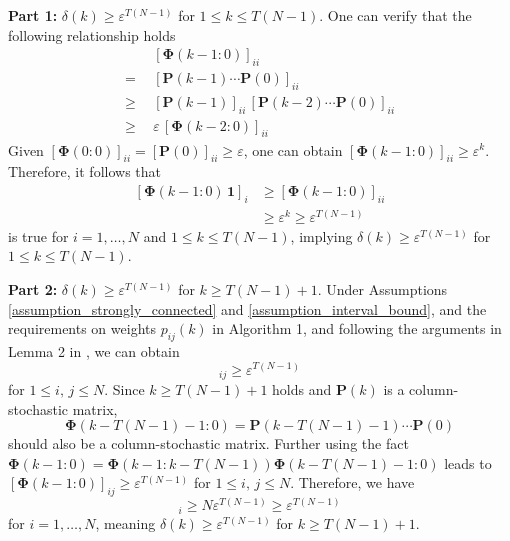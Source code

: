 \documentclass{IEEEtran}
\begin{document}
\textbf{Part 1:} $\delta(k) \geq \varepsilon^{T(N-1)}$ for $1 \leq k \leq T(N-1)$. One can verify that the following relationship holds
\begin{equation} 
\begin{aligned}
& [\mathbf{\Phi}(k-1:0)]_{ii} \\
= \ \ & [\mathbf{P}(k-1) \cdots \mathbf{P}(0)]_{ii} \\
\geq \ \ & [\mathbf{P}(k-1)]_{ii} \, [\mathbf{P}(k-2) \cdots \mathbf{P}(0)]_{ii}\\
\geq \ \ & \varepsilon \, [\mathbf{\Phi}(k-2:0)]_{ii}
\end{aligned} 
\end{equation}
Given $[\mathbf{\Phi}(0:0)]_{ii}=[\mathbf{P}(0)]_{ii} \geq \varepsilon$, one can obtain $[\mathbf{\Phi}(k-1:0)]_{ii} \geq \varepsilon^k$. Therefore, it follows that
\begin{equation} 
\begin{aligned}
\left[\mathbf{\Phi}(k-1:0) \, \mathbf{1}\right]_i & \geq [\mathbf{\Phi}(k-1:0)]_{ii} \\
& \geq \varepsilon^k \geq \varepsilon^{T(N-1)}
\end{aligned}
\end{equation}	
is true for $i=1,\ldots, N$ and $1 \leq k \leq T(N-1)$, implying $\delta(k) \geq \varepsilon^{T(N-1)}$ for $1 \leq k \leq T(N-1)$.

\textbf{Part 2:} $\delta(k) \geq \varepsilon^{T(N-1)}$ for $k \geq T(N-1)+1$. Under Assumptions \ref{assumption_strongly_connected} and \ref{assumption_interval_bound}, and the requirements on weights $p_{ij}(k)$ in Algorithm 1, and following the arguments in Lemma 2 in \cite{nedic2009distributed}, we can obtain
\begin{equation}
[\mathbf{\Phi}(k-1:k-T(N-1))]_{ij} \geq \varepsilon^{T(N-1)}
\end{equation}
for $1 \leq i, \, j \leq N$. Since $k\geq T(N-1)+1$ holds and $\mathbf{P}(k)$ is a column-stochastic matrix,
\begin{equation}
\mathbf{\Phi}(k-T(N-1)-1:0) = \mathbf{P}(k-T(N-1)-1) \cdots \mathbf{P}(0)
\end{equation}
should also be a column-stochastic matrix. Further using the fact
$\mathbf{\Phi}(k-1:0) = \mathbf{\Phi}(k-1:k-T(N-1)) \mathbf{\Phi}(k-T(N-1)-1:0)$ leads to $[\mathbf{\Phi}(k-1:0)]_{ij} \geq \varepsilon^{T(N-1)}$ for $1 \leq i, \, j \leq N$. Therefore, we have
\begin{equation}
[\mathbf{\Phi}(k-1:0) \, \mathbf{1}]_i \geq N \varepsilon^{T(N-1)} \geq \varepsilon^{T(N-1)}
\end{equation}
for $i=1,\ldots, N$, meaning $\delta(k) \geq \varepsilon^{T(N-1)}$ for $k\geq T(N-1)+1$.
\end{document}
